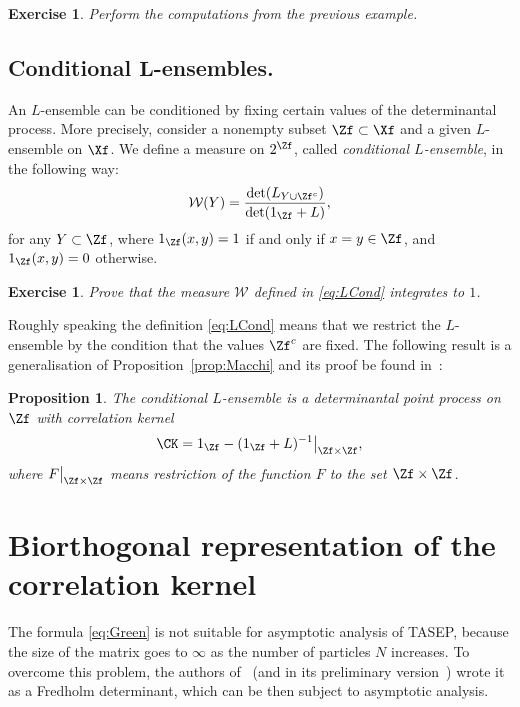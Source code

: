 \documentclass[]{pcmi}
\theoremstyle{plain}
\newtheorem{proposition}[equation]{Proposition}
\newtheorem{exercise}[equation]{Exercise}
\theoremstyle{definition}
\begin{document}
\begin{exercise}
 Perform the computations from the previous example.
\end{exercise}

\subsection{Conditional $\mathbf L$-ensembles.}

An $L$-ensemble can be conditioned by fixing certain values of the determinantal process. More precisely, consider a nonempty subset $\Zf\subset\Xf$ and a given $L$-ensemble on $\Xf$. We define a measure on $2^\Zf$, called \emph{conditional $L$-ensemble}, in the following way:
\begin{equation}\label{eq:LCond}
\mathcal{W}(Y)=\frac{\det(L_{Y\cup\Zf^c})}{\det(1_\Zf+L)},
\end{equation}
for any $Y \subset \Zf$, where $1_\Zf(x,y) = 1$ if and only if $x = y \in \Zf$, and $1_\Zf(x,y) = 0$ otherwise.

\begin{exercise}
 Prove that the measure $\mathcal{W}$ defined in \eqref{eq:LCond} integrates to $1$.
\end{exercise}

\noindent Roughly speaking the definition \eqref{eq:LCond} means that we restrict the $L$-ensemble by the condition that the values $\Zf^c$ are fixed. The following result is a generalisation of Proposition~\ref{prop:Macchi} and its proof be found in~\cite[Prop.~1.2]{borodinRains}:

\begin{proposition}\label{prop:ConditionalLensembles}
The conditional $L$-ensemble is a determinantal point process on $\Zf$ with correlation kernel
\begin{equation}\label{eq:K_LCond}
 \CK=1_\Zf-(1_\Zf+L)^{-1}\big|_{\Zf\times\Zf},
\end{equation}
where $F \big|_{\Zf\times\Zf}$ means restriction of the function $F$ to the set $\Zf\times\Zf$.
\end{proposition}

\section{Biorthogonal representation of the correlation kernel}

The formula \eqref{eq:Green} is not suitable for asymptotic analysis of TASEP, because the size of the matrix goes to $\infty$ as the number of particles $N$ increases. To overcome this problem, the authors of~\cite{borFerPrahSasam} (and in its preliminary version~\cite{sasamoto}) wrote it as a Fredholm determinant, which can be then subject to asymptotic analysis.
\end{document}
